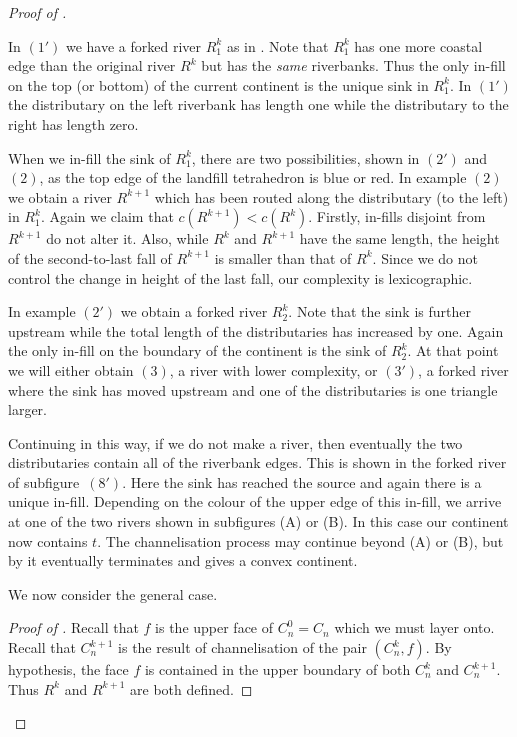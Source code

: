 \documentclass[12pt]{amsart}
\begin{document}
\begin{proof}[Proof of ]
\begin{example}
In $(1')$ we have a forked river $R^k_1$ as in .  Note that $R^k_1$ has one more coastal edge than the original river $R^k$ but has the \emph{same} riverbanks.  Thus the only in-fill on the top (or bottom) of the current continent is the unique sink in $R^k_1$.  In $(1')$ the distributary on the left riverbank has length one while the distributary to the right has length zero.  

When we in-fill the sink of $R^k_1$, there are two possibilities, shown in $(2')$ and $(2)$, as the top edge of the landfill tetrahedron is blue or red.  In example $(2)$ we obtain a river $R^{k+1}$ which has been routed along the distributary (to the left) in $R^k_1$.  Again we claim that $c(R^{k+1}) < c(R^k)$.  Firstly, in-fills disjoint from $R^{k+1}$ do not alter it.  Also, while $R^k$ and $R^{k+1}$ have the same length, the height of the second-to-last fall of $R^{k+1}$ is smaller than that of $R^k$.  Since we do not control the change in height of the last fall, our complexity is lexicographic. 


In example $(2')$ we obtain a forked river $R^k_2$.  Note that the sink is further upstream while the total length of the distributaries has increased by one.  Again the only in-fill on the boundary of the continent is the sink of $R^k_2$.  At that point we will either obtain $(3)$, a river with lower complexity, or $(3')$, a forked river where the sink has moved upstream and one of the distributaries is one triangle larger. 

Continuing in this way, if we do not make a river, then eventually the two distributaries contain all of the riverbank edges.  This is shown in the forked river of subfigure~$(8')$.  Here the sink has reached the source and again there is a unique in-fill.  Depending on the colour of the upper edge of this in-fill, we arrive at one of the two rivers shown in subfigures (A) or (B).  In this case our continent now contains $t$. The channelisation process may continue beyond (A) or (B), but by  it eventually terminates and gives a convex continent.
\end{example}

We now consider the general case.  

\begin{proof}[Proof of ]
Recall that $f$ is the upper face of $C_n^0 = C_n$ which we must layer onto.  Recall that $C^{k+1}_n$ is the result of channelisation of the pair $(C^k_n, f)$.  By hypothesis, the face $f$ is contained in the upper boundary of both $C^k_n$ and $C^{k+1}_n$.  Thus $R^k$ and $R^{k+1}$ are both defined. 


\end{proof}
\end{proof}
\end{document}
